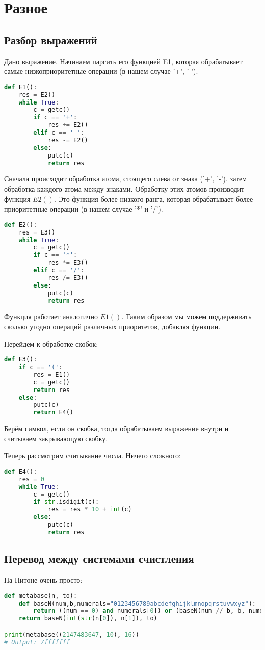 \chapter{Разное}
\section{Разбор выражений}
Дано выражение. Начинаем парсить его функцией E1, которая обрабатывает самые низкоприоритетные операции (в нашем случае '+', '-').
\begin{lstlisting}[language=Python]
def E1():
	res = E2()
	while True:
		c = getc()
		if c == '+':
			res += E2()
		elif c == '-':
			res -= E2()
		else:
			putc(c)
			return res
\end{lstlisting}
Сначала происходит обработка атома, стоящего слева от знака ('+', '-'), затем обработка каждого атома между знаками. Обработку этих атомов производит функция $E2()$. Это функция более низкого ранга, которая обрабатывает более приоритетные операции (в нашем случае '*' и '/').
\begin{lstlisting}[language=Python]
def E2():
	res = E3()
	while True:
		c = getc()
		if c == '*':
			res *= E3()
		elif c == '/':
			res /= E3()
		else:
			putc(c)
			return res
\end{lstlisting}
Функция работает аналогично $E1()$. Таким образом мы можем поддерживать сколько угодно операций различных приоритетов, добавляя функции.

Перейдем к обработке скобок:
\begin{lstlisting}[language=Python]
def E3():
	if c == '(':
		res = E1()
		c = getc()
		return res
	else:
		putc(c)
		return E4()
\end{lstlisting}
Берём символ, если он скобка, тогда обрабатываем выражение внутри и считываем закрывающую скобку.

Теперь рассмотрим считывание числа. Ничего сложного:
\begin{lstlisting}[language=Python]
def E4():
	res = 0
	while True:
		c = getc()
		if str.isdigit(c):
			res = res * 10 + int(c)
		else:
			putc(c)
			return res
\end{lstlisting}

\section{Перевод между системами счистления}
На Питоне очень просто:
\begin{lstlisting}[language=Python]
def metabase(n, to):
    def baseN(num,b,numerals="0123456789abcdefghijklmnopqrstuvwxyz"):
        return ((num == 0) and numerals[0]) or (baseN(num // b, b, numerals).lstrip(numerals[0]) + numerals[num % b])
    return baseN(int(str(n[0]), n[1]), to)

print(metabase((2147483647, 10), 16))
# Output: 7fffffff
\end{lstlisting}